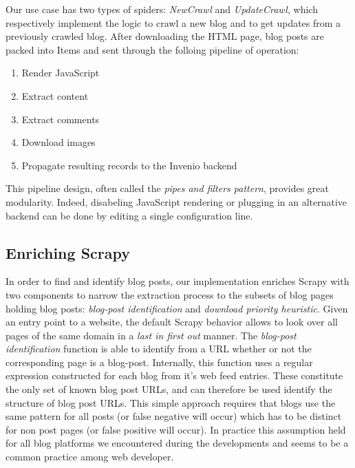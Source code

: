 Our use case has two types of spiders: \emph{NewCrawl} and \emph{UpdateCrawl}, which respectively implement the logic to crawl a new blog and to get updates from a previously crawled blog. After downloading the HTML page, blog posts are packed into Items and sent through the folloing pipeline of operation:
\begin{enumerate}[noitemsep]
  \item Render JavaScript
  \item Extract content
  \item Extract comments
  \item Download images
  \item Propagate resulting records to the Invenio backend
\end{enumerate}
This pipeline design, often called the \emph{pipes and filters pattern}\cite[Chapter Messaging Systems]{hohpe2003}, provides great modularity. Indeed, disabeling JavaScript rendering or plugging in an alternative backend can be done by editing a single configuration line.


\subsection{Enriching Scrapy}
%
In order to find and identify blog posts, our implementation enriches Scrapy with two components to narrow the extraction process to the subsets of blog pages holding blog posts: \emph{blog-post identification} and \emph{download priority heuristic}. Given an entry point to a website, the default Scrapy behavior allows to look over all pages of the same domain in a \emph{last in first out} manner. The \emph{blog-post identification} function is able to identify from a URL whether or not the corresponding page is a blog-post. Internally, this function uses a regular expression constructed for each blog from it's web feed entries. These constitute the only set of known blog post URLs, and can therefore be used identify the structure of blog post URLs. This simple approach requires that blogs use the same pattern for all posts (or false negative will occur) which has to be distinct for non post pages (or false positive will occur). In practice this assumption held for all blog platforms we encountered during the developments and seems to be a common practice among web developer.

